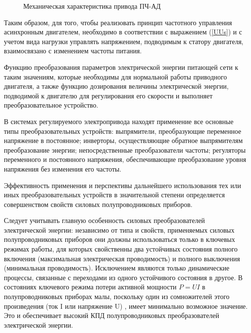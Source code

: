         \begin{figure}[h!]
            \caption{Механическая характеристика привода ПЧ-АД}
            \label{fig:mech}
        \end{figure}

        Таким образом, для того, чтобы реализовать принцип частотного
        управления асинхронным двигателем, необходимо в соответствии с
        выражением (\ref{UUs}) и с учетом вида нагрузки управлять напряжением,
        подводимым к статору двигателя, взаимосвязано с изменением частоты
        питания.

        Функцию преобразования параметров электрической энергии питающей сети к
        таким значениям, которые необходимы для нормальной работы приводного
        двигателя, а также функцию дозирования величины электрической энергии,
        подводимой к двигателю для регулирования его скорости и выполняет
        преобразовательное устройство.

        В системах регулируемого электропривода находят применение все основные
        типы преобразовательных устройств: выпрямители, преобразующие
        переменное напряжение в постоянное; инверторы, осуществляющие обратное
        выпрямителям преобразование энергии; непосредственные преобразователи
        частоты; регуляторы переменного и постоянного напряжения,
        обеспечивающие преобразование уровня напряжения без изменения его
        частоты.

        Эффективность применения и перспективы дальнейшего использования тех
        или иных преобразовательных устройств в значительной степени
        определяется совершенством свойств силовых полупроводниковых приборов.

        Следует учитывать главную особенность силовых преобразователей
        электрической энергии: независимо от типа и свойств, применяемых
        силовых полупроводниковых приборов они должны использоваться только в
        ключевых режимах работы, для которых свойственны два устойчивых
        состояния полного включения (максимальная электрическая проводимость) и
        полного выключения (минимальная проводимость). Исключением являются
        только динамические процессы, связанные с переходами из одного
        устойчивого состояния в другое. В состояниях ключевого режима потери
        активной мощности $P=UI$ в полупроводниковых приборах малы, поскольку
        один из сомножителей этого произведения (ток I или напряжение U) ,
        имеет минимально возможное значение. Это и обеспечивает высокий КПД
        полупроводниковых преобразователей электрической энергии.

